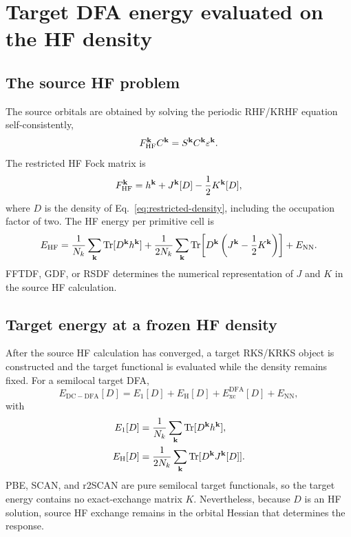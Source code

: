 \section{Target DFA energy evaluated on the HF density}
\label{sec:fixed-density-energy}

\subsection{The source HF problem}

The source orbitals are obtained by solving the periodic RHF/KRHF equation
self-consistently,
\begin{equation}
  F_{\mathrm{HF}}^{\mathbf{k}}C^{\mathbf{k}}
  =S^{\mathbf{k}}C^{\mathbf{k}}\varepsilon^{\mathbf{k}}.
  \label{eq:hf-roothaan}
\end{equation}
The restricted HF Fock matrix is
\begin{equation}
  F_{\mathrm{HF}}^{\mathbf{k}}
  =h^{\mathbf{k}}+J^{\mathbf{k}}[D]-\frac12K^{\mathbf{k}}[D],
  \label{eq:hf-fock}
\end{equation}
where $D$ is the density of Eq.~\eqref{eq:restricted-density}, including the
occupation factor of two.  The HF energy per primitive cell is
\begin{equation}
  E_{\mathrm{HF}}
  =\frac{1}{N_k}\sum_{\mathbf{k}}\operatorname{Tr}[D^{\mathbf{k}}h^{\mathbf{k}}]
   +\frac{1}{2N_k}\sum_{\mathbf{k}}\operatorname{Tr}\!\left[
      D^{\mathbf{k}}\left(J^{\mathbf{k}}-\frac12K^{\mathbf{k}}\right)\right]
   +E_{\mathrm{NN}}.
  \label{eq:hf-energy}
\end{equation}
FFTDF, GDF, or RSDF determines the numerical representation of $J$ and $K$ in
the source HF calculation.

\subsection{Target energy at a frozen HF density}

After the source HF calculation has converged, a target RKS/KRKS object is
constructed and the target functional is evaluated while the density remains
fixed.  For a semilocal target DFA,
\begin{equation}
  E_{\mathrm{DC-DFA}}[D]
  =E_1[D]+E_{\mathrm H}[D]+E_{\mathrm{xc}}^{\mathrm{DFA}}[D]
   +E_{\mathrm{NN}},
  \label{eq:dc-energy-components}
\end{equation}
with
\begin{align}
  E_1[D]
  &=\frac{1}{N_k}\sum_{\mathbf{k}}\operatorname{Tr}[D^{\mathbf{k}}h^{\mathbf{k}}],
  \label{eq:dc-one-electron-energy}\\
  E_{\mathrm H}[D]
  &=\frac{1}{2N_k}\sum_{\mathbf{k}}\operatorname{Tr}[D^{\mathbf{k}}J^{\mathbf{k}}[D]].
  \label{eq:dc-hartree-energy}
\end{align}
PBE, SCAN, and r2SCAN are pure semilocal target functionals, so the target
energy contains no exact-exchange matrix $K$.  Nevertheless, because $D$ is an
HF solution, source HF exchange remains in the orbital Hessian that determines
the response.

